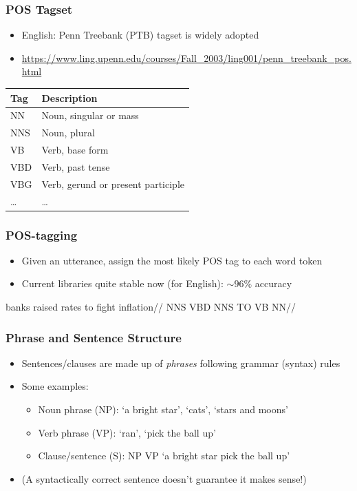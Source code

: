 \begin{frame}
\frametitle{POS Tagset}
\begin{itemize}
\item English: Penn Treebank (PTB) tagset is widely adopted \parencite{marcus1993building}
\item \url{https://www.ling.upenn.edu/courses/Fall_2003/ling001/penn_treebank_pos.html}
\end{itemize}
 
\begin{center}
\begin{tabular}{ll}
\toprule
Tag & Description\\
\midrule
NN & Noun, singular or mass\\
NNS & Noun, plural\\
VB & Verb, base form\\
VBD & Verb, past tense\\
VBG & Verb, gerund or present participle\\
\ldots & \ldots\\
\bottomrule
\end{tabular}
\end{center}

\end{frame}


\begin{frame}
\frametitle{POS-tagging}
    
\begin{itemize}
\item Given an utterance, assign the most likely POS tag to each word token
\item Current libraries quite stable now (for English): $\sim 96\%$ accuracy
\end{itemize}

\ex{}
\begingl
\gla {} banks raised rates to fight inflation//
\glb {} NNS VBD NNS TO VB NN//
\endgl
\xe 

\end{frame}


\begin{frame}
\frametitle{Phrase and Sentence Structure}
    
\begin{itemize}[<+->]
\item Sentences/clauses are made up of \emph{phrases} following grammar (syntax) rules
\item Some examples:
\begin{itemize}
\item Noun phrase (NP): `a bright star', `cats', `stars and moons'
\item Verb phrase (VP): `ran', `pick the ball up'
\item Clause/sentence (S): NP VP `a bright star pick the ball up'
\end{itemize}
\item (A syntactically correct sentence doesn't guarantee it makes sense!)
\end{itemize}

\end{frame}



